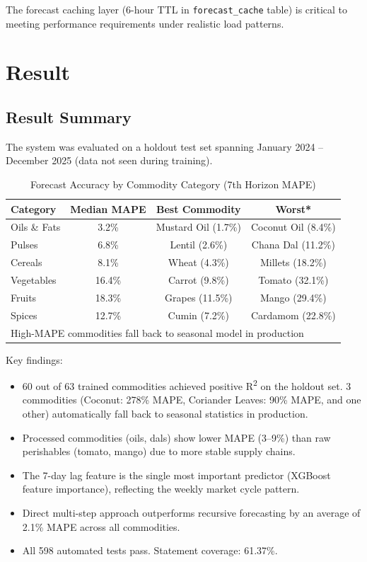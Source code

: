 \documentclass[12pt,a4paper]{report}
\begin{document}
The forecast caching layer (6-hour TTL in \texttt{forecast\_cache} table) is critical to
meeting performance requirements under realistic load patterns.

\chapter{Result}

\section{Result Summary}

The system was evaluated on a holdout test set spanning January 2024 -- December 2025
(data not seen during training).

\begin{table}[H]
\centering
\caption{Forecast Accuracy by Commodity Category (7th Horizon MAPE)}
\label{tab:accuracy}
\begin{tabular}{|l|c|c|c|}
\hline
\textbf{Category} & \textbf{Median MAPE} & \textbf{Best Commodity} & \textbf{Worst*} \\
\hline
Oils \& Fats & 3.2\% & Mustard Oil (1.7\%) & Coconut Oil (8.4\%) \\
Pulses & 6.8\% & Lentil (2.6\%) & Chana Dal (11.2\%) \\
Cereals & 8.1\% & Wheat (4.3\%) & Millets (18.2\%) \\
Vegetables & 16.4\% & Carrot (9.8\%) & Tomato (32.1\%) \\
Fruits & 18.3\% & Grapes (11.5\%) & Mango (29.4\%) \\
Spices & 12.7\% & Cumin (7.2\%) & Cardamom (22.8\%) \\
\hline
\multicolumn{4}{l}{\small *High-MAPE commodities fall back to seasonal model in production} \\
\hline
\end{tabular}
\end{table}

Key findings:
\begin{itemize}
    \item 60 out of 63 trained commodities achieved positive R\textsuperscript{2} on the
    holdout set. 3 commodities (Coconut: 278\% MAPE, Coriander Leaves: 90\% MAPE, and one
    other) automatically fall back to seasonal statistics in production.
    \item Processed commodities (oils, dals) show lower MAPE (3--9\%) than raw perishables
    (tomato, mango) due to more stable supply chains.
    \item The 7-day lag feature is the single most important predictor (XGBoost feature
    importance), reflecting the weekly market cycle pattern.
    \item Direct multi-step approach outperforms recursive forecasting by an average of
    2.1\% MAPE across all commodities.
    \item All 598 automated tests pass. Statement coverage: 61.37\%.
\end{itemize}
\end{document}
